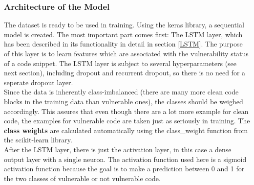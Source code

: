 \documentclass[
	a4paper,
	pagesize,
	pdftex,
	12pt,
	twoside, %
	BCOR=5mm, %
	ngerman,
	fleqn,
	final,
	]{scrartcl}
\begin{document}
\subsubsection{Architecture of the Model}

The dataset is ready to be used in training. Using the keras library, a sequential model is created. The most important part comes first: The LSTM layer, which has been described in its functionality in detail in section \ref{LSTM}. The purpose of this layer is to learn features which are associated with the vulnerability status of a code snippet. The LSTM layer is subject to several hyperparameters (see next section), including dropout and recurrent dropout, so there is no need for a seperate dropout layer. \\
Since the data is inherently class-imbalanced (there are many more clean code blocks in the training data than vulnerable ones), the classes should be weighed accordingly. This assures that even though there are a lot more example for clean code, the examples for vulnerable code are taken just as seriously in training. The \textbf{class weights} are calculated automatically using the class\_weight function from the scikit-learn library.\\
After the LSTM layer, there is just the activation layer, in this case a dense output layer with a single neuron. The activation function used here is a sigmoid activation function because the goal is to make a prediction between 0 and 1 for the two classes of vulnerable or not vulnerable code. 
\end{document}
